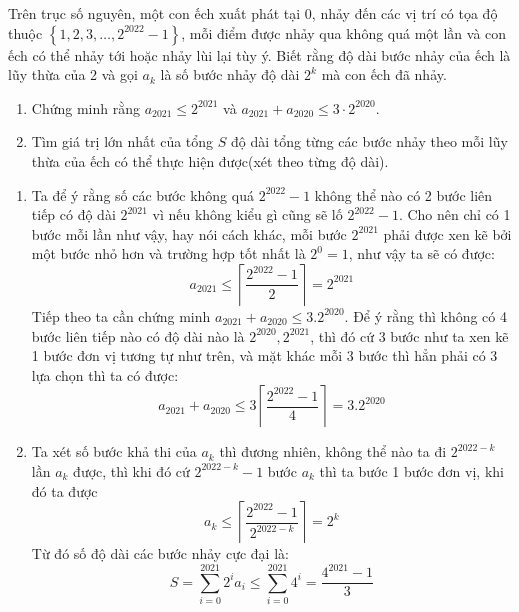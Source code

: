 \documentclass[11pt]{scrartcl}
\begin{document}
\begin{itemize}[label=, leftmargin=0em, itemsep=0.5em]
    \begin{bt}
        Trên trục số nguyên, một con ếch xuất phát tại 0, nhảy đến các vị trí có tọa độ thuộc $\left\{1,2,3, \ldots, 2^{2022}-1\right\}$, mỗi điểm được nhảy qua không quá một lần và con ếch có thể nhảy tới hoặc nhảy lùi lại tùy ý. Biết rằng độ dài bước nhảy của ếch là lũy thừa của 2 và gọi $a_k$ là số bước nhảy độ dài $2^k$ mà con ếch đã nhảy.
    \begin{enumerate}[label=(\alph*)]
        \item Chứng minh rằng $a_{2021} \leq 2^{2021}$ và $a_{2021}+a_{2020} \leq 3 \cdot 2^{2020}$.
        \item Tìm giá trị lớn nhất của tổng $S$ độ dài tổng từng các bước nhảy theo mỗi lũy thừa của ếch có thể thực hiện được(xét theo từng độ dài).
    \end{enumerate}
    \end{bt}
    \begin{sol}
        \begin{enumerate}
            \item Ta để ý rằng số các bước không quá $2^{2022} -1 $ không thể nào có 2 bước liên tiếp có độ dài $2^{2021}$ vì nếu không kiểu gì cũng sẽ lố $2^{2022} - 1$. Cho nên chỉ có 1 bước mỗi lần như vậy, hay nói cách khác, mỗi bước $2^{2021}$ phải được xen kẽ bởi một bước nhỏ hơn và trường hợp tốt nhất là $2^0 = 1$, như vậy ta sẽ có được:
            $$
            a_{2021} \leq \left\lceil \frac{2^{2022} - 1}{2}\right\rceil   = 2^{2021}
            $$
            Tiếp theo ta cần chứng minh $a_{2021} + a_{2020} \leq 3.2^{2020}$. Để ý rằng thì không có 4 bước liên tiếp nào có độ dài nào là $2^{2020},2^{2021}$, thì đó cứ 3 bước như ta xen kẽ 1 bước đơn vị tương tự như trên, và mặt khác mỗi 3 bước thì hẳn phải có 3 lựa chọn thì ta có được:
            $$
            a_{2021} + a_{2020} \leq 3\left\lceil \frac{2^{2022} - 1}{4}\right\rceil = 3.2^{2020}
            $$
            \item Ta xét số bước khả thi của $a_k$ thì đương nhiên, không thể nào ta đi $2^{2022 - k}$ lần $a_k$ được, thì khi đó cứ $2^{2022 - k} - 1$ bước $a_k$ thì ta bước 1 bước đơn vị, khi đó ta được
            $$
            a_k \leq \left\lceil \frac{2^{2022} - 1}{2^{2022 - k}} \right\rceil = 2^k
            $$
            Từ đó số độ dài các bước nhảy cực đại là:
            $$
            S = \sum_{i = 0}^{2021} 2^i a_i \leq \sum_{i=0}^{2021} 4^i = \frac{4^{2021}- 1}{3}
            $$
            \end{enumerate}
    \end{sol}
   

\end{itemize}
\end{document}

